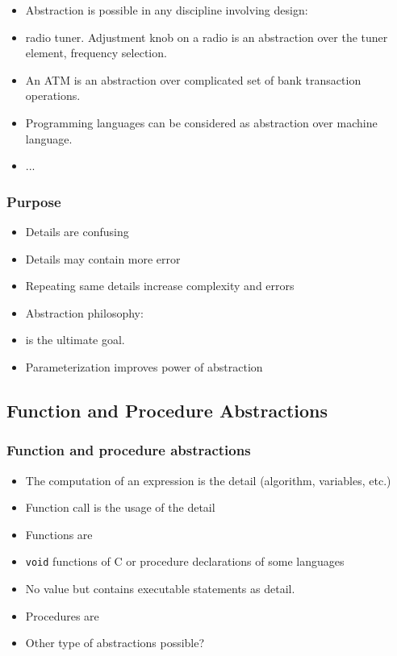 \begin{frame}
 \begin{itemize}[<+->]
  \item Abstraction is possible in any discipline involving design:
  \item radio tuner. Adjustment knob on a radio is an abstraction over the
  tuner element, frequency selection.
 \item An ATM is an abstraction over complicated set of bank transaction operations.
 \item Programming languages can be considered as abstraction over machine language.
 \item ...
 \end{itemize}
\end{frame}

\begin{frame}
 \frametitle{Purpose}
 \begin{itemize}[<+->]
  \item Details are confusing
  \item Details may contain more error
  \item Repeating same details increase complexity and errors
  \item Abstraction philosophy: 
  \item {} is the ultimate goal.
  \item Parameterization improves power of abstraction
 \end{itemize}
\end{frame}

\subsection{Function and Procedure Abstractions}
\begin{frame}
\frametitle{Function and procedure abstractions}
\begin{itemize}[<+->]
 \item The computation of an expression is the detail (algorithm, variables, etc.)
 \item Function call is the usage of the detail
 \item Functions are 
 \item \texttt{void} functions of C or  \textsf{procedure} declarations of some languages
 \item No value but contains executable statements  as detail.
 \item Procedures are  
 \item Other type of abstractions possible?
\end{itemize}
\end{frame}

